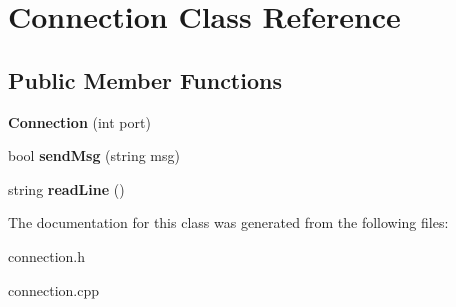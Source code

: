 \hypertarget{class_connection}{\section{Connection Class Reference}
\label{class_connection}
}
\subsection*{Public Member Functions}
\begin{DoxyCompactItemize}
\item 
\hypertarget{class_connection_aad8a0cdce616f656250fa12edb59104a}{{\bfseries Connection} (int port)}\label{class_connection_aad8a0cdce616f656250fa12edb59104a}

\item 
\hypertarget{class_connection_a4b9f6db1fb42fc9857f829fa0bc52e6e}{bool {\bfseries send\-Msg} (string msg)}\label{class_connection_a4b9f6db1fb42fc9857f829fa0bc52e6e}

\item 
\hypertarget{class_connection_a1df16b436751b686d96c24ca0c498659}{string {\bfseries read\-Line} ()}\label{class_connection_a1df16b436751b686d96c24ca0c498659}

\end{DoxyCompactItemize}


The documentation for this class was generated from the following files\-:\begin{DoxyCompactItemize}
\item 
connection.\-h\item 
connection.\-cpp\end{DoxyCompactItemize}
